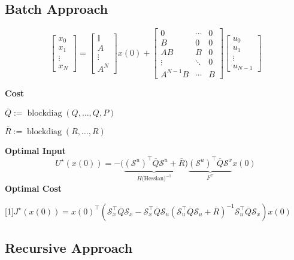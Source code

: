 \subsection{Batch Approach}

$$ \begin{bmatrix}
		x_0    \\
		x_1    \\
		\vdots \\
		x_N
	\end{bmatrix}
	=
	\begin{bmatrix}
		\mathbb{I} \\
		A          \\
		\vdots     \\
		A^N
	\end{bmatrix}
	x(0) +
	\begin{bmatrix}
		0        & \cdots & 0 \\
		B        & 0      & 0 \\
		AB       & B      & 0 \\
		\vdots   & \ddots & 0 \\
		A^{N-1}B & \cdots & B
	\end{bmatrix}
	\begin{bmatrix}
		u_0    \\
		u_1    \\
		\vdots \\
		u_{N-1}
	\end{bmatrix} $$

\textbf{Cost}

$\overline{Q} := \mathop{\mathrm{blockdiag}}(Q,\dots, Q,P)$

$\overline{R} := \mathop{\mathrm{blockdiag}}(R,\dots, R)$

\textbf{Optimal Input}
$$ U^\star(x(0)) =
	- \bigl(
	\underbrace{
			(\mathcal{S}^u)^\top \overline{Q} \mathcal{S}^u + \overline{R}
		}_{H\text{(Hessian)}^{-1}}
	\bigr)
	\underbrace{
		(\mathcal{S}^u)^\top \overline{Q}\mathcal{S}^x
	}_ {F^\top}
	x(0)
$$
\textbf{Optimal Cost}

\scalebox{0.97}[1]{$
		\scriptstyle
		J^\star(x(0)) = x(0)^\top (
		\mathcal{S}_x^\top \overline{Q} \mathcal{S}_x
		- \mathcal{S}_x^\top \overline{Q} \mathcal{S}_u
		(\mathcal{S}_u^\top \overline{Q} \mathcal{S}_u
		+ \overline{R})^{-1}
		\mathcal{S}_u^\top \overline{Q} \mathcal{S}_x
		)x(0)$}

\subsection{Recursive Approach}

